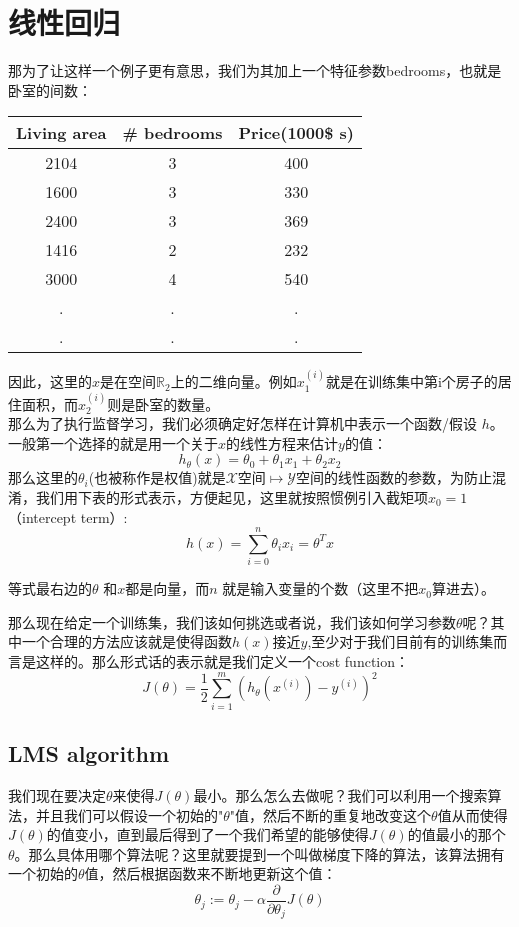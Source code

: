 \documentclass[UTF8]{ctexart}
\begin{document}
\section{线性回归}
那为了让这样一个例子更有意思，我们为其加上一个特征参数bedrooms，也就是卧室的间数：
\begin{center}
\begin{tabular}[alignment]{c|c|c}
\hline
Living area & \# bedrooms & Price(1000\$ s) \\ \hline
2104 & 3 & 400 \\ \hline
1600 & 3 & 330 \\ \hline
2400 & 3 & 369 \\ \hline
1416 & 2 & 232 \\ \hline
3000 & 4 & 540 \\ \hline
. & . & . \\ \hline
. & . & . \\ \hline
\end{tabular}
\end{center}

因此，这里的$x$是在空间$\mathbb{R}_{2}$上的二维向量。例如$x_{1}^{(i)}$就是在训练集中第i个房子的居住面积，而$x_{2}^{(i)}$则是卧室的数量。\\
那么为了执行监督学习，我们必须确定好怎样在计算机中表示一个函数/假设 $h$。一般第一个选择的就是用一个关于$x$的线性方程来估计$y$的值：
\[ h_{\theta}(x)=\theta_{0}+\theta_{1}x_{1}+\theta_{2}x_{2}\]
那么这里的$\theta_{i}$(也被称作是权值)就是$\mathcal{X}空间 \mapsto \mathcal{Y}$空间的线性函数的参数，为防止混淆，我们用下表的形式表示，方便起见，这里就按照惯例引入截矩项$x_{0}=1$（intercept term）:
\[h(x)=\sum_{i=0}^{n}{\theta_{i}x_{i}}=\theta^{T}x \]

等式最右边的$\theta $ 和$x$都是向量，而$n$ 就是输入变量的个数（这里不把$x_{0}$算进去）。

那么现在给定一个训练集，我们该如何挑选或者说，我们该如何学习参数$\theta$呢？其中一个合理的方法应该就是使得函数$h(x)$接近$y$,至少对于我们目前有的训练集而言是这样的。那么形式话的表示就是我们定义一个cost function：
\[J(\theta) = \frac{1}{2} \sum_{i=1}^{m}{(h_{\theta}(x^{(i)})-y^{(i)})^{2}} \]

\subsection{LMS algorithm}
我们现在要决定$\theta$来使得$J(\theta)$最小。那么怎么去做呢？我们可以利用一个搜索算法，并且我们可以假设一个初始的"$
\theta$"值，然后不断的重复地改变这个$\theta$值从而使得$J(\theta)$的值变小，直到最后得到了一个我们希望的能够使得$J(\theta)$的值最小的那个$\theta$。那么具体用哪个算法呢？这里就要提到一个叫做梯度下降的算法，该算法拥有一个初始的$\theta$值，然后根据函数来不断地更新这个值：
\[ \theta_{j}:= \theta_{j} - \alpha \frac{\partial }{\partial \theta_{j}}  J(\theta) \]
\end{document}
